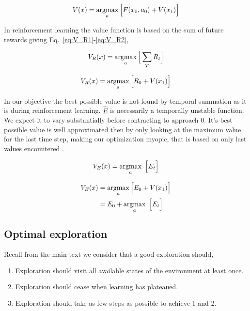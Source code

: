 \begin{equation}
	\label{eq:V_F2}
	V(x) = \operatorname*{argmax}_a \Big [ F(x_0, a_0) + V(x_1) \Big ]
\end{equation}

In reinforcement learning the value function is based on the sum of future rewards giving Eq.~\ref{eq:V_R1}-\ref{eq:V_R2},

\begin{equation}
	\label{eq:V_R1}
	V_R(x) = \operatorname*{argmax}_a \Big [ \sum_T R_t \Big ]
\end{equation}

\begin{equation}
	\label{eq:V_R2}
	V_R(x) = \operatorname*{argmax}_a \Big [ R_0 + V(x_1) \Big ] \\
\end{equation}

In our objective the best possible value is not found by temporal summation as it is during reinforcement learning. $\hat E$ is necessarily a temporally unstable function. We expect it to vary substantially before contracting to approach 0. It's best possible value is well approximated then by only looking at the maximum value for the last time step, making our optimization myopic, that is based on only last values encountered \citep{Hocker2019}.

\begin{equation}
	\label{eq:V_E1} 
	V_E(x) = \operatorname*{argmax}_a \ \Big [ E_t \Big ]
\end{equation}

\begin{equation}
	\label{eq:V_E2} 
	\begin{split}
	V_E(x) &= \operatorname*{argmax}_a \Big [ E_0 + V(x_1) \Big ] \\
		   &= E_0 + \operatorname*{argmax}_a \ \Big [ E_t \Big ] \\
	\end{split}
\end{equation}


\subsection*{Optimal exploration} 

Recall from the main text we consider that a good exploration should,

\begin{enumerate}
	\item Exploration should visit all available states of the environment at least once.
	\item Exploration should cease when learning has plateaued.
	\item Exploration should take as few steps as possible to achieve 1 and 2.
\end{enumerate}

